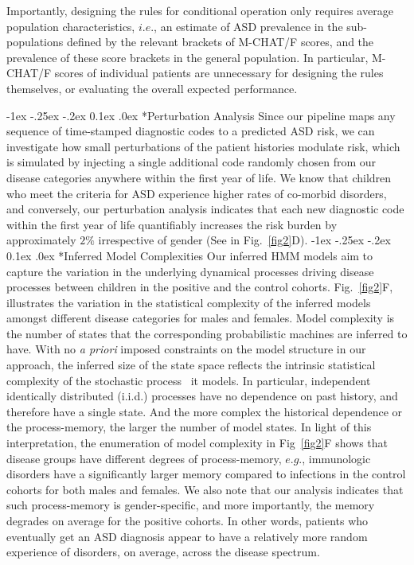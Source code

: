 \documentclass[onecolumn,,10pt]{IEEEtran}
\makeatletter
\renewcommand\subsection{\@startsection {section}{1}{\z@}%
  {-1ex \@plus -.25ex \@minus -.2ex}%
  {0.1ex \@plus.0ex}%
  {\fontsize{11}{12}\selectfont\bfseries\sffamily\color{DodgerBlue4}}}
\def\treatment{positive\xspace}
\makeatother
\begin{document}
Importantly, designing the rules for  conditional  operation  only requires average population characteristics, $i.e.$, an  estimate of ASD prevalence in the sub-populations defined by the  relevant brackets of M-CHAT/F scores, and the prevalence of these score brackets in the general population. In particular,   M-CHAT/F scores of individual patients are unnecessary for designing the rules themselves, or evaluating the overall expected performance. 
%

\subsection*{Perturbation Analysis}
Since our pipeline maps any sequence of time-stamped diagnostic codes to a predicted ASD risk, we can investigate how small perturbations of the patient histories modulate risk, which is  simulated by injecting a single additional code randomly chosen from our disease categories anywhere within the first year of life. We  know that  children who meet the criteria for ASD experience higher rates of co-morbid disorders, and conversely, our perturbation analysis indicates that each new diagnostic code within the first year of life quantifiably increases the risk burden by approximately $2\%$ irrespective of gender (See in Fig.~\ref{fig2}D).
%
\subsection*{Inferred Model Complexities}
Our inferred HMM models aim to capture the variation in the underlying dynamical processes driving disease processes between children in the \treatment and the control cohorts.
Fig.~\ref{fig2}F, illustrates the variation in the statistical complexity of the inferred models amongst different disease categories for males and females. Model complexity is the number of states that the corresponding probabilistic machines are inferred to have. With no \textit{a priori} imposed constraints on the model structure in our approach, the inferred size of the state space  reflects the intrinsic statistical complexity of the stochastic process~\cite{CRUTCHFIELD199411} it models. In particular, independent identically distributed (i.i.d.)  processes  have no dependence on past history, and therefore  have a single state. And  the more complex the historical dependence or the process-memory, the larger the number of model states. In  light of this interpretation, the enumeration of  model complexity in Fig~\ref{fig2}F  shows that  disease groups have different degrees of process-memory, $e.g.$, immunologic disorders have a significantly larger memory compared to infections in the control cohorts for both males and females. We also note that our analysis indicates that such process-memory is gender-specific, and more importantly, the memory degrades on average for the \treatment cohorts. In other words, patients who eventually get an ASD diagnosis appear to have a relatively more random experience of disorders, on average, across the disease spectrum.%
%
\end{document}
